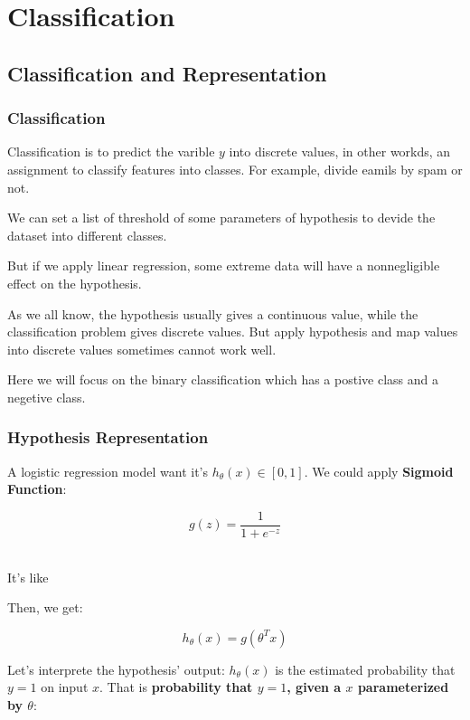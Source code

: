 \documentclass[black,simple]{../elegantbook}
\begin{document}
\fi 
\def\chapname{03classification}

\chapter{Classification}

\section{Classification and Representation}

\subsection{Classification}

Classification is to predict the varible \(y\) into discrete values, in other workds, an assignment to  classify features into classes. For example, divide eamils by spam or not. 

We can set a list of threshold of some parameters of hypothesis to devide the dataset into different classes.

But if we apply linear regression, some extreme data will have a nonnegligible effect on the hypothesis.

As we all know, the hypothesis usually gives a continuous value,  while the classification problem gives discrete values. But apply hypothesis and map values into discrete values sometimes cannot work well.

Here we will focus on the binary classification which has a postive class and a negetive class.

\subsection{Hypothesis Representation}

A logistic regression model want it's \(h_\theta (x) \in [0, 1]\). We could apply \textbf{Sigmoid Function}:

\[
g(z) = \frac{1}{1 + e^{-z}}    
\]
\

It's like 

Then, we get: 

\[
h_\theta (x) = g(\theta^T x)    
\]

Let's interprete the hypothesis' output: \(h_\theta(x)\) is the estimated probability that \(y = 1\) on input \(x\). That is \textbf{probability that \(y = 1\), given a \(x\) parameterized by \(\theta\)}:
\end{document}
